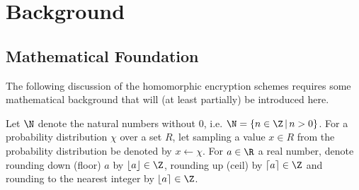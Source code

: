 \chapter{Background}
\label{chap:background}

\section{Mathematical Foundation}
The following discussion of the homomorphic encryption schemes requires some mathematical background that
will (at least partially) be introduced here.

Let $\N$ denote the natural numbers without $0$, i.e. $\N = \{n \in \Z \,|\, n > 0\}$.
For a probability distribution $\chi$ over a set $R$, let sampling a value $x \in R$ from the probability distribution be denoted by $x \leftarrow \chi$.
For $a \in \R$ a real number, denote rounding down (floor) $a$ by $\lfloor a \rfloor \in \Z$,
rounding up (ceil) by $\lceil a \rceil \in \Z$ and rounding to the nearest integer by
$\lfloor a \rceil \in \Z$.

